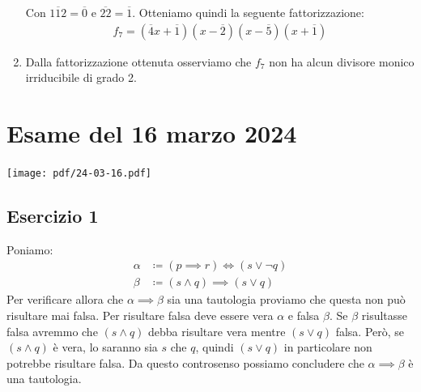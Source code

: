 \begin{enumerate}[label=(\textit{\roman*})]
	\begin{center}
	\end{center}
	Con $\overline{112}=\overline{0}$ e $\overline{22}=\overline{1}$. Otteniamo quindi la seguente fattorizzazione:
	\begin{align*}
		f_{7} = (\overline{4}x+\overline{1})(x-\overline{2})(x-\overline{5})(x+\overline{1})
	\end{align*}
	\item Dalla fattorizzazione ottenuta osserviamo che $f_{7}$ non ha alcun divisore monico irriducibile di grado 2.
\end{enumerate}
\vfill
\section{Esame del 16 marzo 2024}
\begin{center}
	\texttt{[image: pdf/24-03-16.pdf]}
\end{center}
\subsection*{Esercizio 1}
Poniamo:
\begin{align*}
	\alpha &\coloneqq (p \implies r) \iff(s \lor \neg q) \\
	\beta &\coloneqq (s \land q) \implies (s \lor q)
\end{align*} 
Per verificare allora che $\alpha \implies \beta$ sia una tautologia proviamo che questa non può risultare mai falsa. Per risultare falsa deve essere vera $\alpha$ e falsa $\beta$. Se $\beta$ risultasse falsa avremmo che $(s \land q)$ debba risultare vera mentre $(s \lor q)$ falsa. Però, se $(s \land q)$ è vera, lo saranno sia $s$ che $q$, quindi $(s \lor q)$ in particolare non potrebbe risultare falsa. Da questo controsenso possiamo concludere che $\alpha \implies \beta$ è una tautologia. \hfill \blacksquare
